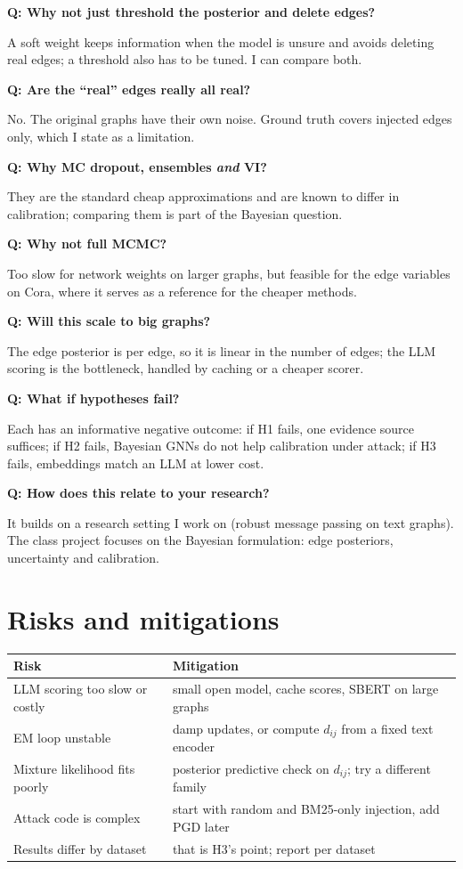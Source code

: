 \documentclass[11pt]{article}
\newcommand{\q}[1]{\par\medskip\noindent\textbf{\color{accent}Q: #1}\par\noindent}
\begin{document}
\q{Why not just threshold the posterior and delete edges?}
A soft weight keeps information when the model is unsure and avoids deleting real edges; a
threshold also has to be tuned. I can compare both.

\q{Are the ``real'' edges really all real?}
No. The original graphs have their own noise. Ground truth covers injected edges only, which
I state as a limitation.

\q{Why MC dropout, ensembles \emph{and} VI?}
They are the standard cheap approximations and are known to differ in calibration; comparing
them is part of the Bayesian question.

\q{Why not full MCMC?}
Too slow for network weights on larger graphs, but feasible for the edge variables on Cora,
where it serves as a reference for the cheaper methods.

\q{Will this scale to big graphs?}
The edge posterior is per edge, so it is linear in the number of edges; the LLM scoring is
the bottleneck, handled by caching or a cheaper scorer.

\q{What if hypotheses fail?}
Each has an informative negative outcome: if H1 fails, one evidence source suffices; if H2
fails, Bayesian GNNs do not help calibration under attack; if H3 fails, embeddings match an
LLM at lower cost.

\q{How does this relate to your research?}
It builds on a research setting I work on (robust message passing on text graphs). The class
project focuses on the Bayesian formulation: edge posteriors, uncertainty and calibration.

\section{Risks and mitigations}
\begin{center}
\small
\begin{tabularx}{\linewidth}{>{\raggedright\arraybackslash}X>{\raggedright\arraybackslash}X}
\toprule
Risk & Mitigation \\
\midrule
LLM scoring too slow or costly & small open model, cache scores, SBERT on large graphs \\
EM loop unstable & damp updates, or compute $d_{ij}$ from a fixed text encoder \\
Mixture likelihood fits poorly & posterior predictive check on $d_{ij}$; try a different family \\
Attack code is complex & start with random and BM25-only injection, add PGD later \\
Results differ by dataset & that is H3's point; report per dataset \\
\bottomrule
\end{tabularx}
\end{center}
\end{document}

